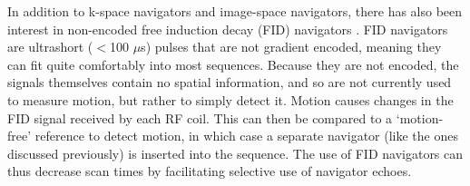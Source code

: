 \documentclass[class=article, crop=false]{standalone}
\begin{document}
\par 
In addition to k-space navigators and image-space navigators, there has also been interest in non-encoded free induction decay (FID) navigators \parencite{Waszak2016,MRM:MRM22797}. FID navigators are ultrashort ($<$100 $\mu$s) pulses that are not gradient encoded, meaning they can fit quite comfortably into most sequences. Because they are not encoded, the signals themselves contain no spatial information, and so are not currently used to measure motion, but rather to simply detect it. Motion causes changes in the FID signal received by each RF coil. This can then be compared to a `motion-free' reference to detect motion, in which case a separate navigator (like the ones discussed previously) is inserted into the sequence. The use of FID navigators can thus decrease scan times by facilitating selective use of navigator echoes. 
\end{document}
